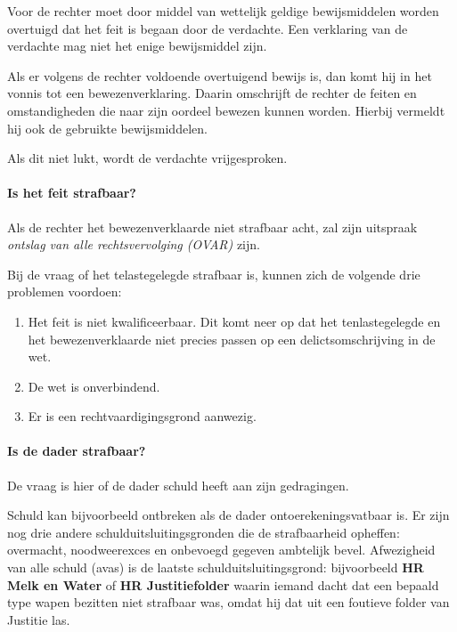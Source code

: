 \documentclass{article}
\begin{document}
Voor de rechter moet door middel van wettelijk geldige bewijsmiddelen worden
overtuigd dat het feit is begaan door de verdachte. Een verklaring van de
verdachte mag niet het enige bewijsmiddel zijn.

Als er volgens de rechter voldoende overtuigend bewijs is, dan komt hij in het
vonnis tot een bewezenverklaring. Daarin omschrijft de rechter de feiten en
omstandigheden die naar zijn oordeel bewezen kunnen worden. Hierbij vermeldt
hij ook de gebruikte bewijsmiddelen.

Als dit niet lukt, wordt de verdachte vrijgesproken.

\paragraph{Is het feit strafbaar?}

Als de rechter het bewezenverklaarde niet strafbaar acht, zal zijn uitspraak
\emph{ontslag van alle rechtsvervolging (OVAR)} zijn.

Bij de vraag of het telastegelegde strafbaar is, kunnen zich de volgende drie
problemen voordoen:

\begin{enumerate}

  \item Het feit is niet kwalificeerbaar. Dit komt neer op dat het
    tenlastegelegde en het bewezenverklaarde niet precies passen op een
    delictsomschrijving in de wet.

  \item De wet is onverbindend.

  \item Er is een rechtvaardigingsgrond aanwezig.

\end{enumerate}

\paragraph{Is de dader strafbaar?} De vraag is hier of de dader schuld heeft
aan zijn gedragingen.

Schuld kan bijvoorbeeld ontbreken als de dader ontoerekeningsvatbaar is. Er
zijn nog drie andere schulduitsluitingsgronden die de strafbaarheid opheffen:
overmacht, noodweerexces en onbevoegd gegeven ambtelijk bevel. Afwezigheid
van alle schuld (avas) is de laatste schulduitsluitingsgrond: bijvoorbeeld
\textbf{HR Melk en Water} of \textbf{HR Justitiefolder} waarin iemand dacht dat
een bepaald type wapen bezitten niet strafbaar was, omdat hij dat uit een
foutieve folder van Justitie las.
\end{document}

